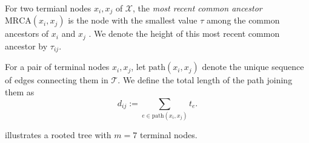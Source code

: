 \begin{definition}\label{def:mrca} For two termianl nodes $x_i, x_j$ of $\mathcal{X}$, the \emph{most recent common ancestor} $\mathrm{MRCA}(x_i,x_j)$ is the node with the smallest value $\tau$ among the common ancestors of $x_i$ and $x_j$ \cite{semple2003phylogenetics}. We denote the height of this most recent common ancestor by $\tau_{ij}$.
\end{definition}
\noindent For a pair of terminal nodes $x_i, x_j$, let $\mathrm{path}(x_i,x_j)$ denote the unique sequence of edges connecting them in $\mathcal{T}$. We define the total length of the path joining them as
\begin{equation}\label{eq:path_length}
d_{ij} := \sum_{e \in \mathrm{path}(x_i,x_j)} t_e .
\end{equation}

 illustrates a rooted tree with $m = 7$ terminal nodes.



